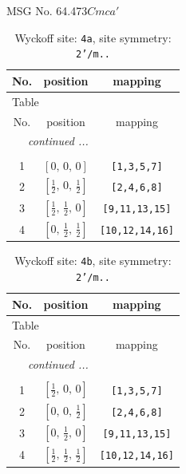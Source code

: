 \documentclass[fleqn,8pt]{jsarticle}
\begin{document}
\setcounter{MaxMatrixCols}{32}

\renewcommand{\tablename}{Table~}
\renewcommand{\figurename}{Figure~}
\begin{center}
\LARGE
MSG No. 64.473\quad$Cmca'$
\end{center}
\renewcommand{\arraystretch}{1.2}
\begin{longtable}{ccc}
\caption{Wyckoff site: {\tt 4a}, site symmetry: {\tt 2'/m..}}
 \\
 \hline \hline
No. & position & mapping \\ \hline \endfirsthead

\multicolumn{2}{l}{\tablename\ \thetable{}} \\
 \hline \hline
No. & position & mapping \\ \hline \endhead

 \hline \hline
\multicolumn{2}{r}{\footnotesize\it continued ...} \\ \endfoot

 \hline \hline
\multicolumn{2}{r}{} \\ \endlastfoot

1 & $\left[ 0,\, 0,\, 0 \right]$ & {\tt [1,3,5,7]} \\ \hline
2 & $\left[ \frac{1}{2},\, 0,\, \frac{1}{2} \right]$ & {\tt [2,4,6,8]} \\ \hline
3 & $\left[ \frac{1}{2},\, \frac{1}{2},\, 0 \right]$ & {\tt [9,11,13,15]} \\ \hline
4 & $\left[ 0,\, \frac{1}{2},\, \frac{1}{2} \right]$ & {\tt [10,12,14,16]} \\
\end{longtable}
\renewcommand{\arraystretch}{1.2}
\begin{longtable}{ccc}
\caption{Wyckoff site: {\tt 4b}, site symmetry: {\tt 2'/m..}}
 \\
 \hline \hline
No. & position & mapping \\ \hline \endfirsthead

\multicolumn{2}{l}{\tablename\ \thetable{}} \\
 \hline \hline
No. & position & mapping \\ \hline \endhead

 \hline \hline
\multicolumn{2}{r}{\footnotesize\it continued ...} \\ \endfoot

 \hline \hline
\multicolumn{2}{r}{} \\ \endlastfoot

1 & $\left[ \frac{1}{2},\, 0,\, 0 \right]$ & {\tt [1,3,5,7]} \\ \hline
2 & $\left[ 0,\, 0,\, \frac{1}{2} \right]$ & {\tt [2,4,6,8]} \\ \hline
3 & $\left[ 0,\, \frac{1}{2},\, 0 \right]$ & {\tt [9,11,13,15]} \\ \hline
4 & $\left[ \frac{1}{2},\, \frac{1}{2},\, \frac{1}{2} \right]$ & {\tt [10,12,14,16]} \\
\end{longtable}
\end{document}
